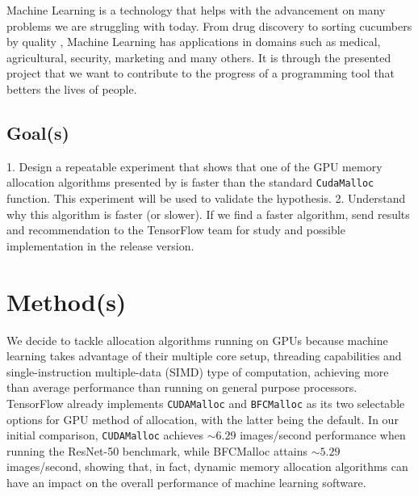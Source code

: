 \documentclass[12pt,twoside]{article}
\newcommand{\resnettimebfc}{5.29}
\newcommand{\resnettimecuda}{6.29}
\begin{document}
Machine Learning is a technology that helps with the advancement on many problems we are struggling with today. From drug discovery \cite{Ramsundar_Kearnes_Riley_Webster_Konerding_Pande_2015} to sorting cucumbers by quality \cite{cucumber}, Machine Learning has applications in domains such as medical, agricultural, security, marketing and many others. It is through the presented project that we want to contribute to the progress of a programming tool that betters the lives of people.

\subsection{Goal(s)}
\label{sec:goal(s)}


1. Design a repeatable experiment that shows that one of the GPU memory allocation algorithms presented by \citeauthor{Vinkler2015} \cite{Vinkler2015} is faster than the standard \texttt{CudaMalloc} function. This experiment will be used to validate the hypothesis. 2. Understand why this algorithm is faster (or slower).
If we find a faster algorithm, send results and recommendation to the TensorFlow team for study and possible implementation in the release version.


\section{Method(s)}
\label{sec:methods}


We decide to tackle allocation algorithms running on GPUs because machine learning takes advantage of their multiple core setup, threading capabilities and single-instruction multiple-data (SIMD) type of computation, achieving more than average performance than running on general purpose processors. TensorFlow already implements \texttt{CUDAMalloc} and \texttt{BFCMalloc} as its two selectable options for GPU method of allocation, with the latter being the default. In our initial comparison, \texttt{CUDAMalloc} achieves ${\sim}\resnettimecuda$ images/second performance when running the ResNet-50 benchmark, while BFCMalloc attains ${\sim}\resnettimebfc$ images/second, showing that, in fact, dynamic memory allocation algorithms can have an impact on the overall performance of machine learning software.
\end{document}
